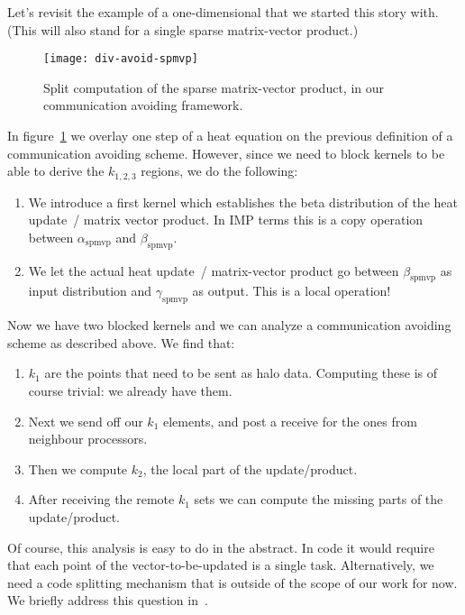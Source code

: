 
Let's revisit the example of a one-dimensional  that we started this story with. (This will also stand
for a single sparse matrix-vector product.)
%
\begin{figure}[ht]
  \texttt{[image: div-avoid-spmvp]}
  \caption{Split computation of the sparse matrix-vector product, in
    our communication avoiding framework.}
  \label{fig:avoidmvp}
\end{figure}
%
In figure~\ref{fig:avoidmvp} we overlay one step of a heat equation
on the previous definition of a communication avoiding scheme.
However, since we need to block kernels to be able to derive the
$k_{1,2,3}$ regions, we do the following:
\begin{enumerate}
\item We introduce a first kernel which establishes the beta
  distribution of the heat update~/ matrix vector product. In IMP
  terms this is a copy operation between $\alpha_{\mathrm{spmvp}}$ and
  $\beta_{\mathrm{spmvp}}$.
\item We let the actual heat update~/ matrix-vector product go between
  $\beta_{\mathrm{spmvp}}$ as input distribution and
  $\gamma_{\mathrm{spmvp}}$ as output. This is a local operation!
\end{enumerate}
Now we have two blocked kernels and we can analyze a communication
avoiding scheme as described above.
We find that:
\begin{enumerate}
\item $k_1$ are the points that need to be sent as halo
  data. Computing these is of course trivial: we already have them.
\item Next we send off our $k_1$ elements, and post a receive for the
  ones from neighbour processors.
\item Then we compute $k_2$, the local part of the update/product.
\item After receiving the remote $k_1$ sets we can compute the missing
  parts of the update/product.
\end{enumerate}

Of course, this analysis is easy to do in the abstract. In code it
would require that each point of the vector-to-be-updated is a single
task. Alternatively, we need a code splitting mechanism that is
outside of the scope of our work for now. We briefly address this
question in~\cite{IMP-16}.

